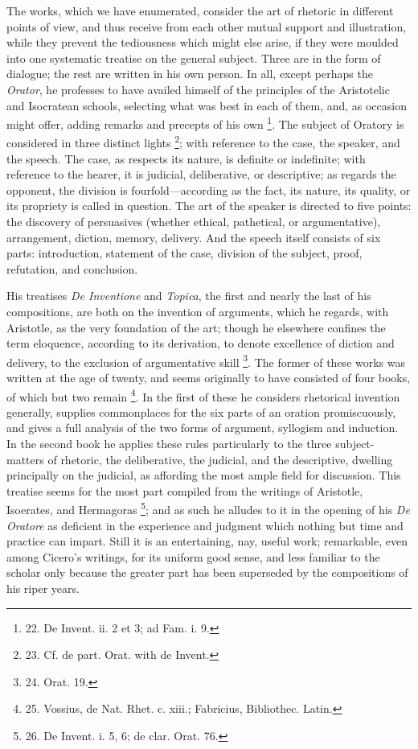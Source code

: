 The works, which we have
enumerated, consider the art of rhetoric in different points of view,
and thus receive from each other mutual support and illustration,
while they prevent the tediousness which might else arise, if they
were moulded into one systematic treatise on the general subject.
Three are in the form of dialogue; the rest are written in his own
person. In all, except perhaps the \emph{Orator}, he professes to have
availed himself of the principles of the Aristotelic and Isocratean
schools, selecting what was best in each of them, and, as occasion
might offer, adding remarks and precepts of his own \footnote{22. De Invent. ii. 2 et 3; ad
Fam. i. 9.}. The
subject of Oratory is considered in three distinct lights \footnote{23. Cf. de part. Orat. with de
Invent.};
with reference to the case, the speaker, and the speech. The case, as respects its nature, is definite or indefinite; with
reference to the hearer, it is judicial, deliberative, or descriptive;
as regards the opponent, the division is fourfold—according as the
fact, its nature, its quality, or its propriety is called in question.
The art of the speaker is directed to five points: the discovery of
persuasives (whether ethical, pathetical, or argumentative),
arrangement, diction, memory, delivery. And the speech itself consists
of six parts: introduction, statement of the case, division of the
subject, proof, refutation, and conclusion.

His treatises \emph{De Inventione}
and \emph{Topica}, the first and nearly the last of his compositions,
are both on the invention of arguments, which he regards, with
Aristotle, as the very foundation of the art; though he elsewhere
confines the term eloquence, according to its derivation, to denote
excellence of diction and delivery, to the exclusion of argumentative
skill \footnote{24.
Orat. 19.}. The former of these works was written at the age of
twenty, and seems originally to have consisted of four books, of which
but two remain \footnote{25. Vossius, de Nat. Rhet. c.
xiii.; Fabricius, Bibliothec. Latin.}. In the first of these he considers
rhetorical invention generally, supplies commonplaces for the six
parts of an oration promiscuously, and gives a full analysis of the
two forms of argument, syllogism and induction. In the second book he
applies these rules particularly to the three subject-matters of
rhetoric, the deliberative, the judicial, and the descriptive,
dwelling principally on the judicial, as affording the most ample
field for discussion. This treatise seems for the most part compiled
from the writings of Aristotle, Isoerates, and Hermagoras \footnote{26. De Invent. i. 5, 6; de
clar. Orat. 76.};
and as such he alludes to it in the opening of his \emph{De Oratore}
as deficient in the experience and judgment which nothing but
time and practice can impart. Still it is an entertaining, nay, useful
work; remarkable, even among Cicero's writings, for its uniform good
sense, and less familiar to the scholar only because the greater part
has been superseded by the compositions of his riper years.

